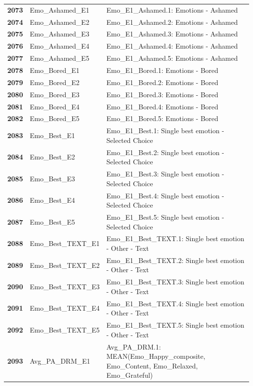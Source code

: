 \documentclass[
  letterpaper,
  DIV=11,
  numbers=noendperiod]{scrartcl}
\begin{document}
\begin{longtable}[t]{>{}cll}
\textbf{2073} & Emo\_Ashamed\_E1 & Emo\_E1\_Ashamed.1: Emotions - Ashamed\\
\textbf{2074} & Emo\_Ashamed\_E2 & Emo\_E1\_Ashamed.2: Emotions - Ashamed\\
\textbf{2075} & Emo\_Ashamed\_E3 & Emo\_E1\_Ashamed.3: Emotions - Ashamed\\
\addlinespace
\textbf{2076} & Emo\_Ashamed\_E4 & Emo\_E1\_Ashamed.4: Emotions - Ashamed\\
\textbf{2077} & Emo\_Ashamed\_E5 & Emo\_E1\_Ashamed.5: Emotions - Ashamed\\
\textbf{2078} & Emo\_Bored\_E1 & Emo\_E1\_Bored.1: Emotions - Bored\\
\textbf{2079} & Emo\_Bored\_E2 & Emo\_E1\_Bored.2: Emotions - Bored\\
\textbf{2080} & Emo\_Bored\_E3 & Emo\_E1\_Bored.3: Emotions - Bored\\
\addlinespace
\textbf{2081} & Emo\_Bored\_E4 & Emo\_E1\_Bored.4: Emotions - Bored\\
\textbf{2082} & Emo\_Bored\_E5 & Emo\_E1\_Bored.5: Emotions - Bored\\
\textbf{2083} & Emo\_Best\_E1 & Emo\_E1\_Best.1: Single best emotion - Selected Choice\\
\textbf{2084} & Emo\_Best\_E2 & Emo\_E1\_Best.2: Single best emotion - Selected Choice\\
\textbf{2085} & Emo\_Best\_E3 & Emo\_E1\_Best.3: Single best emotion - Selected Choice\\
\addlinespace
\textbf{2086} & Emo\_Best\_E4 & Emo\_E1\_Best.4: Single best emotion - Selected Choice\\
\textbf{2087} & Emo\_Best\_E5 & Emo\_E1\_Best.5: Single best emotion - Selected Choice\\
\textbf{2088} & Emo\_Best\_TEXT\_E1 & Emo\_E1\_Best\_TEXT.1: Single best emotion - Other - Text\\
\textbf{2089} & Emo\_Best\_TEXT\_E2 & Emo\_E1\_Best\_TEXT.2: Single best emotion - Other - Text\\
\textbf{2090} & Emo\_Best\_TEXT\_E3 & Emo\_E1\_Best\_TEXT.3: Single best emotion - Other - Text\\
\addlinespace
\textbf{2091} & Emo\_Best\_TEXT\_E4 & Emo\_E1\_Best\_TEXT.4: Single best emotion - Other - Text\\
\textbf{2092} & Emo\_Best\_TEXT\_E5 & Emo\_E1\_Best\_TEXT.5: Single best emotion - Other - Text\\
\textbf{2093} & Avg\_PA\_DRM\_E1 & Avg\_PA\_DRM.1: MEAN(Emo\_Happy\_composite, Emo\_Content, Emo\_Relaxed, Emo\_Grateful)\\

\end{longtable}
\end{document}
